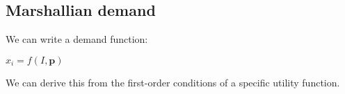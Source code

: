 
\subsection{Marshallian demand}

We can write a demand function:

\(x_i=f(I, \mathbf p)\)

We can derive this from the first-order conditions of a specific utility function.

